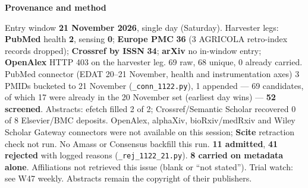 \documentclass[10pt]{article}
\begin{document}
\begin{keybox}
{\sffamily\bfseries\footnotesize\color{Deep}Provenance and method}\\[1.2mm]
{\fontsize{7.2}{8.8}\selectfont
Entry window \textbf{21 November 2026}, single day (Saturday). Harvester legs: \textbf{PubMed} health \textbf{2}, sensing \textbf{0}; \textbf{Europe PMC} \textbf{36} (3 AGRICOLA retro-index records dropped); \textbf{Crossref by ISSN} \textbf{34}; \textbf{arXiv} no in-window entry; \textbf{OpenAlex} HTTP 403 on the harvester leg. 69 raw, 68 unique, 0 already carried. PubMed connector (EDAT 20--21 November, health and instrumentation axes) 3 PMIDs bucketed to 21 November (\texttt{\_conn\_1122.py}), 1 appended --- 69 candidates, of which 17 were already in the 20 November set (earliest day wins) --- \textbf{52 screened}. Abstracts: efetch filled 2 of 2; Crossref/Semantic Scholar recovered 0 of 8 Elsevier/BMC deposits.
OpenAlex, alphaXiv, bioRxiv/medRxiv and Wiley Scholar Gateway connectors were not available on this session; \textbf{Scite} retraction check not run. No Amass or Consensus backfill this run.
\textbf{11 admitted}, \textbf{41 rejected} with logged reasons (\texttt{\_rej\_1122\_21.py}). \textbf{8 carried on metadata alone}. Affiliations not retrieved this issue (blank or ``not stated''). Trial watch: see W47 weekly.
Abstracts remain the copyright of their publishers.\par}
\end{keybox}
\end{document}

